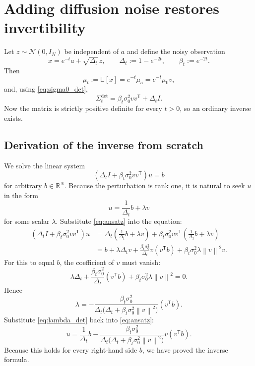 \documentclass[11pt]{article}
\newcommand{\R}{\mathbb{R}}
\newcommand{\E}{\mathbb{E}}
\newcommand{\Id}{I}
\newcommand{\trans}{\mathsf{T}}
\newcommand{\Ncal}{\mathcal{N}}
\newcommand{\norm}[1]{\left\lVert #1 \right\rVert}
\begin{document}
\section{Adding diffusion noise restores invertibility}
Let $z\sim\Ncal(0,\Id_N)$ be independent of $a$ and define the noisy observation
\begin{equation}\label{eq:xt}
 x=e^{-t}a+\sqrt{\Delta_t}\,z,
 \qquad
 \Delta_t:=1-e^{-2t},
 \qquad
 \beta_t:=e^{-2t}.
\end{equation}
Then
\[
 \mu_t:=\E[x]=e^{-t}\mu_a=e^{-t}\mu_0 v,
\]
and, using \eqref{eq:sigma0_det},
\begin{equation}\label{eq:sigmat_det}
\Sigma_t^{\mathrm{det}}
=
\beta_t\sigma_0^2 vv^\trans+\Delta_t\Id.
\end{equation}
Now the matrix is strictly positive definite for every $t>0$, so an ordinary inverse exists.

\subsection{Derivation of the inverse from scratch}
We solve the linear system
\[
(\Delta_t\Id+\beta_t\sigma_0^2 vv^\trans)u=b
\]
for arbitrary $b\in\R^N$. Because the perturbation is rank one, it is natural to seek $u$ in the form
\begin{equation}\label{eq:ansatz}
 u=\frac{1}{\Delta_t}b+\lambda v
\end{equation}
for some scalar $\lambda$. Substitute \eqref{eq:ansatz} into the equation:
\begin{align*}
(\Delta_t\Id+\beta_t\sigma_0^2 vv^\trans)u
&=
\Delta_t\left(\frac{1}{\Delta_t}b+\lambda v\right)
+
\beta_t\sigma_0^2 vv^\trans\left(\frac{1}{\Delta_t}b+\lambda v\right) \\
&=
 b+
 \lambda\Delta_t v+
 \frac{\beta_t\sigma_0^2}{\Delta_t}v(v^\trans b)+
 \beta_t\sigma_0^2\lambda\norm{v}^2v.
\end{align*}
For this to equal $b$, the coefficient of $v$ must vanish:
\[
\lambda\Delta_t+
\frac{\beta_t\sigma_0^2}{\Delta_t}(v^\trans b)+
\beta_t\sigma_0^2\lambda\norm{v}^2=0.
\]
Hence
\begin{equation}\label{eq:lambda_det}
\lambda
=
-
\frac{\beta_t\sigma_0^2}{\Delta_t\bigl(\Delta_t+\beta_t\sigma_0^2\norm{v}^2\bigr)}(v^\trans b).
\end{equation}
Substitute \eqref{eq:lambda_det} back into \eqref{eq:ansatz}:
\[
 u=
 \frac{1}{\Delta_t}b-
 \frac{\beta_t\sigma_0^2}{\Delta_t\bigl(\Delta_t+\beta_t\sigma_0^2\norm{v}^2\bigr)}v(v^\trans b).
\]
Because this holds for every right-hand side $b$, we have proved the inverse formula.
\end{document}
